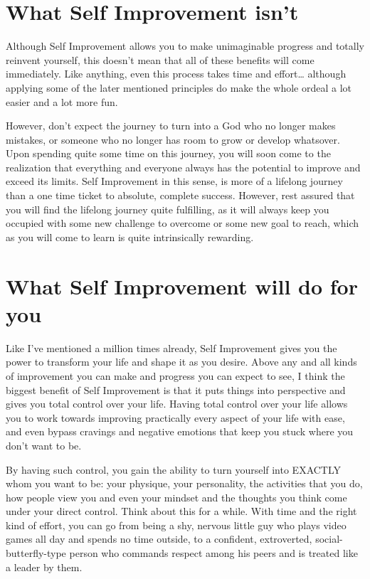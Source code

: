 \documentclass[
]{book}
\begin{document}
\hypertarget{what-self-improvement-isnt}{%
\section{What Self Improvement isn't}\label{what-self-improvement-isnt}}

Although Self Improvement allows you to make unimaginable progress and totally reinvent yourself, this doesn't mean that all of these benefits will come immediately. Like anything, even this process takes time and effort\ldots{} although applying some of the later mentioned principles do make the whole ordeal a lot easier and a lot more fun.

However, don't expect the journey to turn into a God who no longer makes mistakes, or someone who no longer has room to grow or develop whatsover. Upon spending quite some time on this journey, you will soon come to the realization that everything and everyone always has the potential to improve and exceed its limits. Self Improvement in this sense, is more of a lifelong journey than a one time ticket to absolute, complete success. However, rest assured that you will find the lifelong journey quite fulfilling, as it will always keep you occupied with some new challenge to overcome or some new goal to reach, which as you will come to learn is quite intrinsically rewarding.

\hypertarget{what-self-improvement-will-do-for-you}{%
\section{What Self Improvement will do for you}\label{what-self-improvement-will-do-for-you}}

Like I've mentioned a million times already, Self Improvement gives you the power to transform your life and shape it as you desire. Above any and all kinds of improvement you can make and progress you can expect to see, I think the biggest benefit of Self Improvement is that it puts things into perspective and gives you total control over your life. Having total control over your life allows you to work towards improving practically every aspect of your life with ease, and even bypass cravings and negative emotions that keep you stuck where you don't want to be.

By having such control, you gain the ability to turn yourself into EXACTLY whom you want to be: your physique, your personality, the activities that you do, how people view you and even your mindset and the thoughts you think come under your direct control. Think about this for a while. With time and the right kind of effort, you can go from being a shy, nervous little guy who plays video games all day and spends no time outside, to a confident, extroverted, social-butterfly-type person who commands respect among his peers and is treated like a leader by them.
\end{document}
